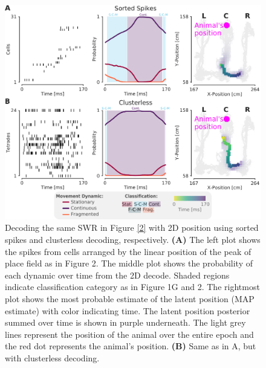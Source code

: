 \documentclass[times, twoside]{zHenriquesLab-StyleBioRxiv}
\begin{document}
\begin{figure}%
\centering
\includegraphics[width=0.80\linewidth]{figures/Figure2-supplemental1/Figure2_v3-supplemental1}
\caption{Decoding the same SWR in Figure \ref{2} with 2D position using sorted spikes and clusterless decoding, respectively. \textbf{(A)} The left plot shows the spikes from cells arranged by the linear position of the peak of place field as in Figure 2. The middle plot shows the probability of each dynamic over time from the 2D decode. Shaded regions indicate classification category as in Figure 1G and 2. The rightmost plot shows the most probable estimate of the latent position (MAP estimate) with color indicating time. The latent position posterior summed over time is shown in purple underneath. The light grey lines represent the position of the animal over the entire epoch and the red dot represents the animal's position. \textbf{(B)} Same as in A, but with clusterless decoding.}
\label{fig:Figure2-Figure supplement 1}
\end{figure}
\end{document}
